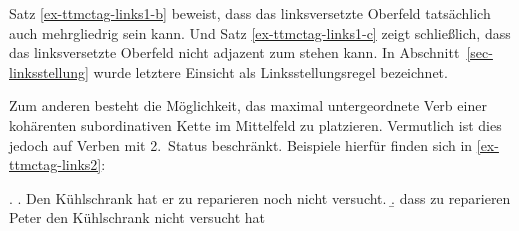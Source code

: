 Satz \ref{ex-ttmctag-links1-b} beweist, dass das linksversetzte Oberfeld tatsächlich auch mehrgliedrig sein kann. Und Satz \ref{ex-ttmctag-links1-c} zeigt schlie\ss lich, dass das linksversetzte Oberfeld nicht adjazent zum  stehen kann. In Abschnitt~\ref{sec-linksstellung} wurde letztere Einsicht als Linksstellungsregel bezeichnet. 

Zum anderen besteht die Möglichkeit, das maximal untergeordnete Verb einer kohärenten subordinativen Kette im Mittelfeld zu platzieren. Vermutlich ist dies jedoch auf Verben mit 2.~Status beschränkt. Beispiele hierfür finden sich in \ref{ex-ttmctag-links2}:

\ex. \label{ex-ttmctag-links2}
\a. Den Kühlschrank hat er zu reparieren noch nicht versucht. \label{ex-ttmctag-links2-a}
\b. dass zu reparieren Peter den Kühlschrank nicht versucht hat \label{ex-ttmctag-links2-b}


